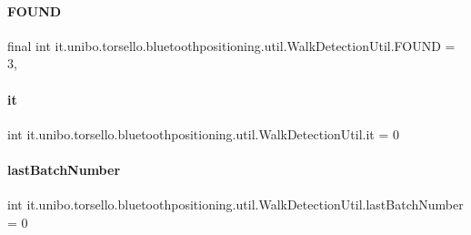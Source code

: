 \paragraph{\texorpdfstring{F\+O\+U\+ND}{FOUND}}
{\footnotesize\ttfamily final int it.\+unibo.\+torsello.\+bluetoothpositioning.\+util.\+Walk\+Detection\+Util.\+F\+O\+U\+ND = 3\hspace{0.3cm}{\ttfamily [static]}, {\ttfamily [private]}}

\hypertarget{classit_1_1unibo_1_1torsello_1_1bluetoothpositioning_1_1util_1_1WalkDetectionUtil_adc95f042e9d3de1551bd8fc5a0a9f734_adc95f042e9d3de1551bd8fc5a0a9f734}{}\label{classit_1_1unibo_1_1torsello_1_1bluetoothpositioning_1_1util_1_1WalkDetectionUtil_adc95f042e9d3de1551bd8fc5a0a9f734_adc95f042e9d3de1551bd8fc5a0a9f734} 
\paragraph{\texorpdfstring{it}{it}}
{\footnotesize\ttfamily int it.\+unibo.\+torsello.\+bluetoothpositioning.\+util.\+Walk\+Detection\+Util.\+it = 0\hspace{0.3cm}{\ttfamily [private]}}

\hypertarget{classit_1_1unibo_1_1torsello_1_1bluetoothpositioning_1_1util_1_1WalkDetectionUtil_af1e33313b691ff961f556450f4120a3b_af1e33313b691ff961f556450f4120a3b}{}\label{classit_1_1unibo_1_1torsello_1_1bluetoothpositioning_1_1util_1_1WalkDetectionUtil_af1e33313b691ff961f556450f4120a3b_af1e33313b691ff961f556450f4120a3b} 
\paragraph{\texorpdfstring{last\+Batch\+Number}{lastBatchNumber}}
{\footnotesize\ttfamily int it.\+unibo.\+torsello.\+bluetoothpositioning.\+util.\+Walk\+Detection\+Util.\+last\+Batch\+Number = 0\hspace{0.3cm}{\ttfamily [private]}}

